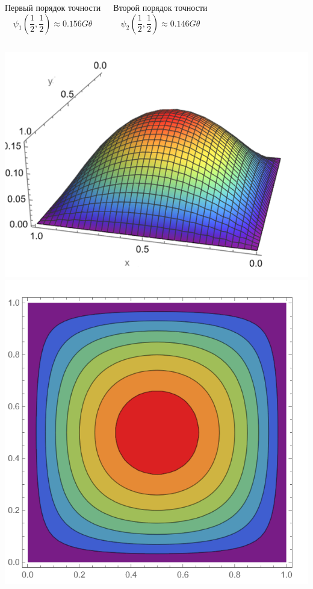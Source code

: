 \documentclass[ignoreonframetext,unicode]{beamer}
\begin{document}
\begin{frame}{}

		\begin{columns}
	\begin{block}{Первый порядок точности}	
		\[
			\psi_1\left(\frac{1}{2}, \frac{1}{2}\right) \approx 0.156 G \theta
		\]
	\end{block}
	\begin{block}{Второй порядок точности}	
		\[
		\psi_2\left(\frac{1}{2}, \frac{1}{2}\right) \approx 0.146 G \theta
		\]
	\end{block}
\end{columns}

	\begin{columns}
	\includegraphics[width=\textwidth]{ritz_graph}%
	\includegraphics[width=\textwidth]{ritz_levels}%
\end{columns}
\end{frame}
\end{document}
